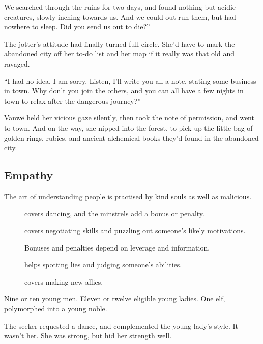 \begin{multicols}{2}
\begin{exampletext}
  We searched through the ruins for two days, and found nothing but acidic creatures, slowly inching towards us.
  And we could out-run them, but had nowhere to sleep.
  Did you send us out to die?''

  The \gls{jotter}'s attitude had finally turned full circle.
  She'd have to mark the abandoned city off her to-do list and her map if it really was that old and ravaged.

  ``I had no idea.
  I am sorry.
  Listen, I'll write you all a note, stating some business in town.
  Why don't you join the others, and you can all have a few nights in town to relax after the dangerous journey?''

  Vanw\"e held her vicious gaze silently, then took the note of permission, and went to town.
  And on the way, she nipped into the forest, to pick up the little bag of golden rings, rubies, and ancient alchemical books they'd found in the abandoned city.

\end{exampletext}

\subsection{Empathy}

The art of understanding people is practised by kind souls as well as malicious.

\begin{description}
  \item[]
    covers dancing, and the minstrels add a bonus or penalty.
  \item[]
    covers negotiating skills and puzzling out someone's likely motivations.

    Bonuses and penalties depend on leverage and information.
  \item[]
    helps spotting lies and judging someone's abilities.
  \item[]
    covers making new allies.
\end{description}

\begin{exampletext}
  Nine or ten young men.
  Eleven or twelve eligible young ladies.
  One elf, polymorphed into a young noble.

  The \gls{seeker} requested a dance, and complemented the young lady's style.
  It wasn't her.
  She was strong, but hid her strength well.


\end{exampletext}
\end{multicols}
